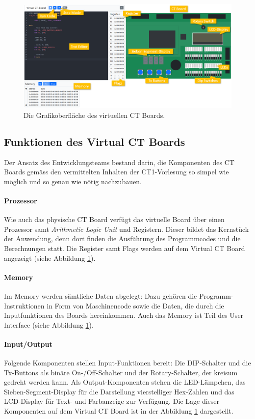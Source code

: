 \documentclass[10pt]{article}
\begin{document}
\begin{figure}[h]
\includegraphics[width=\textwidth]{final}
\caption[size=8pt]{Die Grafikoberfläche des virtuellen CT Boards.}
\label{final}
\end{figure}

\subsection{Funktionen des \glqq Virtual CT Boards\grqq}

Der Ansatz des Entwicklungsteams bestand darin, die Komponenten des CT Boards gemäss den vermittelten Inhalten der CT1-Vorlesung so simpel wie möglich und so genau wie nötig nachzubauen.

\paragraph{Prozessor} Wie auch das physische CT Board verfügt das virtuelle Board über einen Prozessor samt \emph{Arithmetic Logic Unit} und Registern. Dieser bildet das Kernstück der Anwendung, denn dort finden die Ausführung des Programmcodes und die Berechnungen statt. Die Register samt Flags werden auf dem \glqq Virtual CT Board\grqq{} angezeigt (siehe Abbildung \ref{final}).

\paragraph{Memory} Im Memory werden sämtliche Daten abgelegt: Dazu gehören die Programm-Instruktionen in Form von Maschinencode sowie die Daten, die durch die Inputfunktionen des Boards hereinkommen. Auch das Memory ist Teil des User Interface (siehe Abbildung \ref{final}).

\paragraph{Input/Output} Folgende Komponenten stellen Input-Funktionen bereit: Die DIP-Schalter und die Tx-Buttons als binäre On-/Off-Schalter und der Rotary-Schalter, der kreisum gedreht werden kann. Als Output-Komponenten stehen die LED-Lämpchen, das Sieben-Segment-Display für die Darstellung vierstelliger Hex-Zahlen und das LCD-Display für Text- und Farbanzeige zur Verfügung. Die Lage dieser Komponenten auf dem \glqq Virtual CT Board\grqq{} ist in der Abbildung \ref{final} dargestellt.
\end{document}
